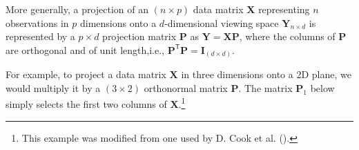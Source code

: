 \documentclass[
  letterpaper,
  10pt,
  krantz2]{krantz}
\begin{document}
More generally, a projection of an \((n \times p)\) data matrix
\(\mathbf{X}\) representing \(n\) observations in \(p\) dimensions onto
a \(d\)-dimensional viewing space \(\mathbf{Y}_{n \times d}\) is
represented by a \(p \times d\) projection matrix \(\mathbf{P}\) as
\(\mathbf{Y} = \mathbf{X} \mathbf{P}\), where the columns of
\(\mathbf{P}\) are orthogonal and of unit length,i.e.,
\(\mathbf{P}^\mathsf{T} \mathbf{P} = \mathbf{I}_{(d \times d)}\).

For example, to project a data matrix \(\mathbf{X}\) in three dimensions
onto a 2D plane, we would multiply it by a \((3 \times 2)\) orthonormal
matrix \(\mathbf{P}\). The matrix \(\mathbf{P}_1\) below simply selects
the first two columns of \(\mathbf{X}\).\footnote{This example was
  modified from one used by D. Cook et al.
  ().}
\end{document}
